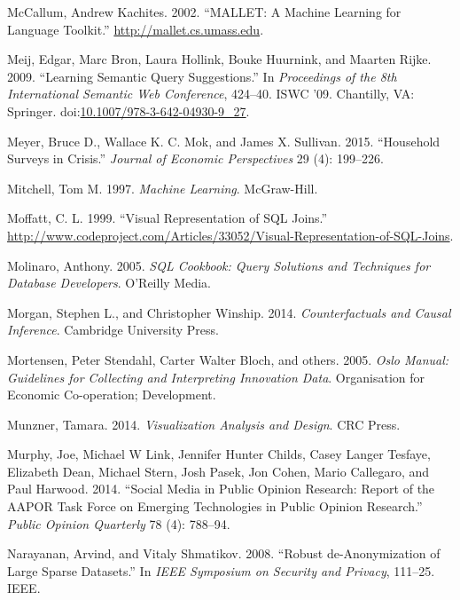 \documentclass[]{krantz}
\begin{document}
\hypertarget{ref-mallet}{}
McCallum, Andrew Kachites. 2002. ``MALLET: A Machine Learning for
Language Toolkit.'' \url{http://mallet.cs.umass.edu}.

\hypertarget{ref-meij-09}{}
Meij, Edgar, Marc Bron, Laura Hollink, Bouke Huurnink, and Maarten
Rijke. 2009. ``Learning Semantic Query Suggestions.'' In
\emph{Proceedings of the 8th International Semantic Web Conference},
424--40. ISWC '09. Chantilly, VA: Springer.
doi:\href{https://doi.org/10.1007/978-3-642-04930-9_27}{10.1007/978-3-642-04930-9\_27}.

\hypertarget{ref-Meyer2015}{}
Meyer, Bruce D., Wallace K. C. Mok, and James X. Sullivan. 2015.
``Household Surveys in Crisis.'' \emph{Journal of Economic Perspectives}
29 (4): 199--226.

\hypertarget{ref-mitchell1997machine}{}
Mitchell, Tom M. 1997. \emph{Machine Learning}. McGraw-Hill.

\hypertarget{ref-vizjoins}{}
Moffatt, C. L. 1999. ``Visual Representation of SQL Joins.''
\url{http://www.codeproject.com/Articles/33052/Visual-Representation-of-SQL-Joins}.

\hypertarget{ref-SQLCookbook}{}
Molinaro, Anthony. 2005. \emph{SQL Cookbook: Query Solutions and
Techniques for Database Developers}. O'Reilly Media.

\hypertarget{ref-morgan2014counterfactuals}{}
Morgan, Stephen L., and Christopher Winship. 2014. \emph{Counterfactuals
and Causal Inference}. Cambridge University Press.

\hypertarget{ref-oecd2005measurement}{}
Mortensen, Peter Stendahl, Carter Walter Bloch, and others. 2005.
\emph{Oslo Manual: Guidelines for Collecting and Interpreting Innovation
Data}. Organisation for Economic Co-operation; Development.

\hypertarget{ref-munzner2014visualization}{}
Munzner, Tamara. 2014. \emph{Visualization Analysis and Design}. CRC
Press.

\hypertarget{ref-murphy2014social}{}
Murphy, Joe, Michael W Link, Jennifer Hunter Childs, Casey Langer
Tesfaye, Elizabeth Dean, Michael Stern, Josh Pasek, Jon Cohen, Mario
Callegaro, and Paul Harwood. 2014. ``Social Media in Public Opinion
Research: Report of the AAPOR Task Force on Emerging Technologies in
Public Opinion Research.'' \emph{Public Opinion Quarterly} 78 (4):
788--94.

\hypertarget{ref-narayanan2008robust}{}
Narayanan, Arvind, and Vitaly Shmatikov. 2008. ``Robust de-Anonymization
of Large Sparse Datasets.'' In \emph{IEEE Symposium on Security and
Privacy}, 111--25. IEEE.
\end{document}

